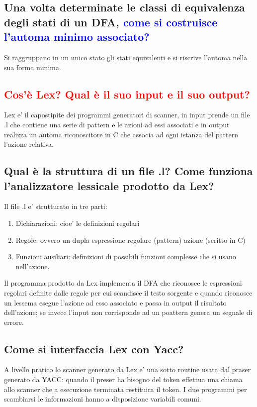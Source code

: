 \documentclass{article}
\begin{document}
\subsection{Una volta determinate le classi di equivalenza degli stati di un DFA, \textcolor{blue}{come si costruisce l'automa minimo associato?}}
Si raggruppano in un unico stato gli stati equivalenti e si riscrive l'automa nella sua forma minima.
\subsection{\textcolor{red}{Cos'è Lex? Qual è il suo input e il suo output?}}
Lex e' il capostipite dei programmi generatori di scanner, in input prende un file .l che contiene una serie di pattern e le azioni ad essi associati e in output
realizza un automa riconoscitore in C che associa ad ogni istanza del pattern l'azione relativa.
\subsection{Qual è la struttura di un file .l? Come funziona l'analizzatore lessicale prodotto da Lex?}
Il file .l e' strutturato in tre parti:
\begin{enumerate}
    \item Dichiarazioni: cioe' le definizioni regolari
    \item Regole: ovvero un dupla {espressione regolare} (pattern) {azione} (scritto in
          C)
    \item Funzioni ausiliari: definizioni di possibili funzioni complesse che si usano
          nell'azione.
\end{enumerate}
Il programma prodotto da Lex implementa il DFA che riconosce le espressioni regolari definite dalle regole per cui scandisce il testo sorgente e quando riconosce
un lessema esegue l'azione ad esso associato e passa in output il risultato dell'azione; se invece l'input non corrisponde ad un poattern genera un segnale di errore.
\subsection{Come si interfaccia Lex con Yacc?}
A livello pratico lo scanner generato da Lex e' una sotto routine usata dal
praser generato da YACC: quando il preser ha bisogno del token effettua una
chiama allo scanner che a esecuzione terminata restituira il token. I due
programmi per scambiarsi le informazioni hanno a disposizione variabili comuni.
\end{document}

